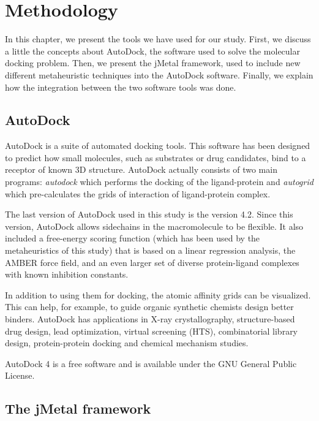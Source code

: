 \chapter{Methodology}
\label{chapter:methodology}

In this chapter, we present the tools we have used for our study. First, we discuss a little the concepts about AutoDock, the software used to solve the molecular docking problem. Then, we present the jMetal framework, used to include new different metaheuristic techniques into the AutoDock software. Finally, we explain how the integration between the two software tools was done.

\section{AutoDock}


AutoDock is a suite of automated docking tools. This software has been designed to predict how small molecules, such as substrates or drug candidates, bind to a receptor of known 3D structure. AutoDock actually consists of two main programs: {\it autodock} which performs the docking of the ligand-protein and {\it autogrid} which pre-calculates the grids of interaction of ligand-protein complex.

The last version of AutoDock used in this study is the version 4.2. Since this version, AutoDock allows sidechains in the macromolecule to be flexible. It also included a free-energy scoring function (which has been used by the metaheuristics of this study) that is based on a linear regression analysis, the AMBER force field, and an even larger set of diverse protein-ligand complexes with known inhibition constants.

In addition to using them for docking, the atomic affinity grids can be visualized. This can help, for example, to guide organic synthetic chemists design better binders. AutoDock has applications in X-ray crystallography, structure-based drug design, lead optimization, virtual screening (HTS), combinatorial library design, protein-protein docking and chemical mechanism studies.

AutoDock 4 is a free software and is available under the GNU General Public License.

\section{The jMetal framework}


